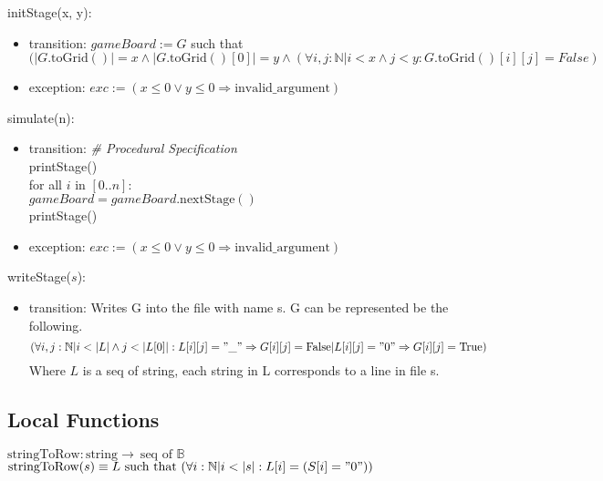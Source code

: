 \documentclass[12pt]{article}
\begin{document}
\noindent initStage(x, y):
\begin{itemize}
\item transition: $gameBoard := G$ such that \\
    $(|G.\text{toGrid}()| = x \land |G.\text{toGrid}()[0]| = y \land (\forall i, j : \mathbb{N}| i < x \land j < y : G.\text{toGrid}()[i][j] = False)$
\item exception: $exc := (x \le 0 \lor y \le 0 \Rightarrow \text{invalid\_argument})$
\end{itemize}

\noindent simulate(n):
\begin{itemize}
\item transition: \textit{\# Procedural Specification} \\
printStage() \\
for all $i$ in $[0..n] : $\\
\hspace{1}$gameBoard = gameBoard.\text{nextStage}()$ \\
\hspace{1}printStage()
\item exception: $exc := (x \le 0 \lor y \le 0 \Rightarrow \text{invalid\_argument})$
\end{itemize}

\noindent writeStage($s$):
\begin{itemize}
\item transition:
    Writes G into the file with name s.
    G can be represented be the following.
    \begin{equation*}
        (\forall i, j: \mathbb{N} | i < |L| \land j < |L[0]| : L[i][j] = "\_" \Rightarrow G[i][j] = \text{False} | L[i][j] = "0" \Rightarrow G[i][j] = \text{True})
    \end{equation*}
    Where $L$ is a seq of string, each string in L corresponds to a line in file s.
\end{itemize}


\subsection*{Local Functions}

\noindent $\text{stringToRow} : \text{string} \rightarrow \ \text{seq of }\mathbb{B} $\\
\noindent
$\text{stringToRow}(s) \equiv L \text{ such that } (\forall i : \mathbb{N} | i < |s| : L[i] = (S[i] = "0"))$ \\
\end{document}
